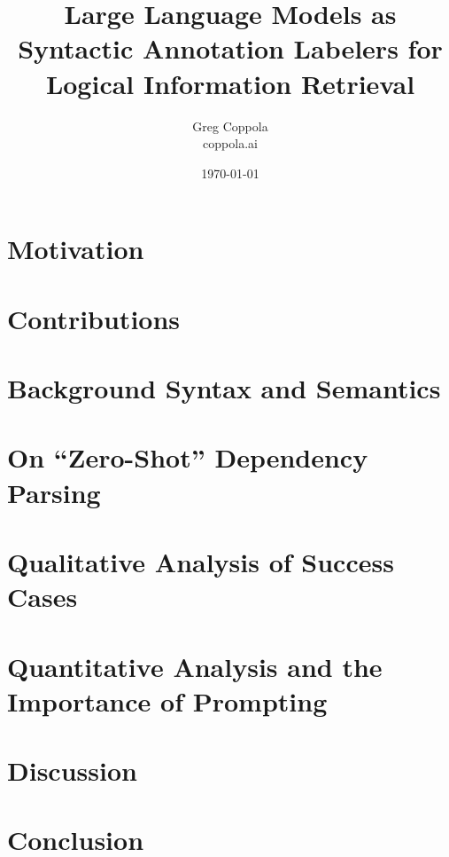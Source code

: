 \documentclass[11pt]{article}
\title{Large Language Models as Syntactic Annotation Labelers for Logical Information Retrieval}
\author{Greg Coppola\\coppola.ai}
\date{\today}
\begin{document}
\maketitle



\section{Motivation}


\section{Contributions}


\section{ Background Syntax and Semantics}



\section{On ``Zero-Shot'' Dependency Parsing}
\section{Qualitative Analysis of Success Cases}
\section{Quantitative Analysis and the Importance of Prompting}


\section{Discussion}


\section{Conclusion}




\end{document}
